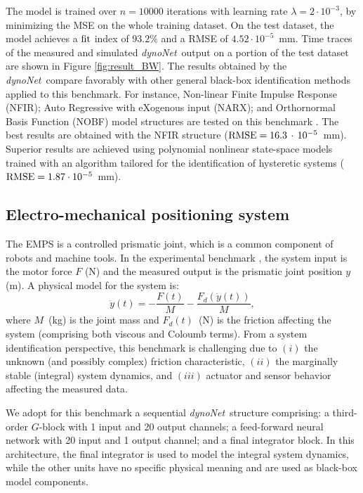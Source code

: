 \documentclass{article}
\newcommand{\Name}{\emph{dynoNet}}
\begin{document}
The model is trained over $n=10000$ iterations with learning rate $\lambda=2\cdot 10^{-3}$, by minimizing the MSE on the whole training dataset. On the test dataset, the model achieves a $\rm fit$ index of $93.2\%$ and a RMSE of $4.52\cdot10^{-5}$~mm.  Time traces of the measured and simulated \Name\ output on a portion of the test dataset are shown in Figure \ref{fig:result_BW}.
The results obtained by the \Name\ compare favorably with other general black-box identification methods applied to this benchmark.  
For instance,   Non-linear Finite Impulse Response (NFIR); Auto Regressive with eXogenous input (NARX); and Orthornormal Basis Function (NOBF) model structures are tested on this benchmark \cite{belz2017automatic}.
The best results are obtained with the NFIR structure ($\rm RMSE = 16.3 \,\cdot\, 10^{-5}$~mm).
Superior results are achieved  using polynomial nonlinear state-space models \cite{esfahani2017polynomial} trained with an algorithm tailored for the identification of hysteretic systems ($\rm RMSE = 1.87 \cdot 10^{-5}$~mm).


\subsection{Electro-mechanical positioning system}
The EMPS is a controlled prismatic joint, which is a common component of robots and machine tools. 
In the experimental benchmark  \cite{janot2019data}, the system input is the motor force $F$ (N) and the measured output is the prismatic  joint position $y$ (m). A physical model for the system is:
\begin{equation*}
\ddot y(t) = -\frac{F(t)}{M} - \frac{F_{d}(\dot y(t))}{M}, 
\end{equation*}
where $M$~(kg) is the joint mass and $F_{d}(t)$~(N) is the friction affecting the system (comprising both viscous and Coloumb terms). From a system identification perspective, this benchmark is challenging due to $(i)$ the unknown 
(and possibly complex) friction characteristic, $(ii)$ the marginally stable (integral) system dynamics, and $(iii)$ actuator and sensor behavior affecting the measured data. %

We adopt for this benchmark a sequential \Name\ structure comprising: a third-order $G$-block with 1 input and 20 output channels; a feed-forward neural network with 20 input and 1 output channel; and a final integrator block. 
In this architecture, the final integrator is used to model the integral system dynamics, while the other units have no 
specific physical meaning and are used as black-box model components.
\end{document}
